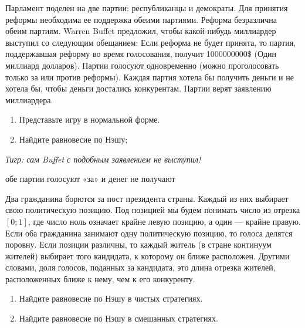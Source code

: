 \begin{problem}
\begin{source}
\cite{miller:gtw}
\end{source}
Парламент поделен на две партии: республиканцы и демократы. Для принятия реформы необходима ее поддержка обеими партиями. Реформа безразлична обеим партиям. Warren Buffet предложил, чтобы какой-нибудь миллиардер выступил со следующим обещанием: Если реформа не будет принята, то партия, поддержавшая реформу во время голосования, получит 1000000000\$ (Один миллиард долларов). Партии голосуют одновременно (можно проголосовать только за или против реформы). Каждая партия хотела бы получить деньги и не хотела бы, чтобы деньги достались конкурентам. Партии верят заявлению миллиардера.\par
\begin{enumerate}
\item  Представьте игру в нормальной форме.\par
\item Найдите равновесие по Нэшу;\par
\end{enumerate}
{\it Тигр: сам Buffet  с подобным заявлением не выступил!}




\begin{sol}
обе партии голосуют «за» и денег не получают
\end{sol}
\end{problem}





\begin{problem}
Два гражданина борются за пост президента страны. Каждый из них выбирает свою политическую позицию. Под позицией мы будем понимать число из отрезка  $\left[0;1\right]$, где число ноль означает крайне левую позицию, а один — крайне правую. Если оба гражданина занимают одну политическую позицию, то голоса делятся поровну. Если позиции различны, то каждый житель (в стране континуум жителей) выбирает того кандидата, к которому он ближе расположен. Другими словами, доля голосов, поданных за кандидата, это длина отрезка жителей, расположенных ближе к нему, чем к его конкуренту.
\begin{enumerate}
\item 	Найдите равновесие по Нэшу в чистых стратегиях.

\item 	Найдите равновесие по Нэшу в смешанных стратегиях.
\end{enumerate}


\begin{sol}

\end{sol}
\end{problem}



